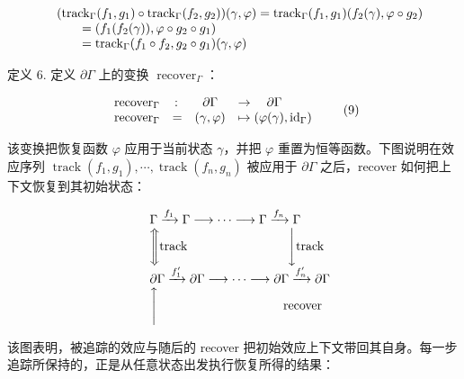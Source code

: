 \[
\begin{array} { r l }
  & ( \operatorname { t r a c k } _ { \Gamma } ( f _ { 1 } , g _ { 1 } ) \circ \operatorname { t r a c k } _ { \Gamma } ( f _ { 2 } , g _ { 2 } ) ) ( \gamma , \varphi ) = \operatorname { t r a c k } _ { \Gamma } ( f _ { 1 } , g _ { 1 } ) ( f _ { 2 } ( \gamma ) , \varphi \circ g _ { 2 } ) \\
  & \qquad = ( f _ { 1 } ( f _ { 2 } ( \gamma ) ) , \varphi \circ g _ { 2 } \circ g _ { 1 } ) \\
  & \qquad = \operatorname { t r a c k } _ { \Gamma } ( f _ { 1 } \circ f _ { 2 } , g _ { 2 } \circ g _ { 1 } ) ( \gamma , \varphi )
\end{array}
\]

定义 6. 定义 \(\partial \Gamma\) 上的变换 \(\operatorname { r e c o v e r } _ { \Gamma }\)：

\[
\begin{array} { l r c l }
  { \operatorname { r e c o v e r } _ { \Gamma } } & { \colon } & { \partial \Gamma } & { \to \quad \partial \Gamma } \\
  { \operatorname { r e c o v e r } _ { \Gamma } } & { = } & { ( \gamma , \varphi ) } & { \mapsto ( \varphi ( \gamma ) , \mathrm { i d } _ { \Gamma } ) }
\end{array}\tag{9}
\]

该变换把恢复函数 \(\varphi\) 应用于当前状态 \(\gamma\)，并把 \(\varphi\) 重置为恒等函数。下图说明在效应序列
\(\operatorname { t r a c k } ( f _ { 1 } , g _ { 1 } ) , \cdots , \operatorname { t r a c k } ( f _ { n } , g _ { n } )\)
被应用于 \(\partial \Gamma\) 之后，recover 如何把上下文恢复到其初始状态：

\[
\begin{array} { r l }
  & \Gamma \xrightarrow { f _ { 1 } } \Gamma \longrightarrow \cdots \longrightarrow \Gamma \xrightarrow { f _ { n } } \Gamma \\
  & \Bigg \Updownarrow \mathrm { t r a c k } \qquad \qquad \qquad \qquad \Bigg \downarrow \mathrm { t r a c k } \\
  & \partial \Gamma \xrightarrow { f _ { 1 } ^ { \prime } } \partial \Gamma \longrightarrow \cdots \longrightarrow \partial \Gamma \xrightarrow { f _ { n } ^ { \prime } } \partial \Gamma \\
  & \Bigg \uparrow \qquad \qquad \qquad \qquad \qquad \mathrm { r e c o v e r }
\end{array}
\]

该图表明，被追踪的效应与随后的 recover 把初始效应上下文带回其自身。每一步追踪所保持的，正是从任意状态出发执行恢复所得的结果：


